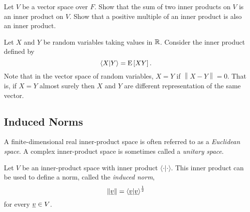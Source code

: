 \begin{problem}
Let $V$ be a vector space over $F$.
Show that the sum of two inner products on $V$ is an inner product on $V$.
Show that a positive multiple of an inner product is also an inner product.
\end{problem}

\begin{example}
Let $X$ and $Y$ be random variables taking values in $\mathbb{R}$.
Consider the inner product defined by
\begin{equation*}
\left\langle X | Y \right\rangle = \mathrm{E} \left[ XY \right] .
\end{equation*}
Note that in the vector space of random variables, $X = Y$ if $\left\| X - Y \right\| = 0$.
That is, if $X = Y$ almost surely then $X$ and $Y$ are different representation of the same vector.
\end{example}


\subsection{Induced Norms}

A finite-dimensional real inner-product space is often referred to as a \emph{Euclidean space}.
A complex inner-product space is sometimes called a \emph{unitary space}.

\begin{definition}
Let $V$ be an inner-product space with inner product $\langle \cdot | \cdot \rangle$.
This inner product can be used to define a norm, called the \emph{induced norm},
\begin{equation*}
\left\| \underline{v} \right\| = \left\langle \underline{v} | \underline{v} \right\rangle^{\frac{1}{2}}
\end{equation*}
for every $\underline{v} \in V$.
\end{definition}

